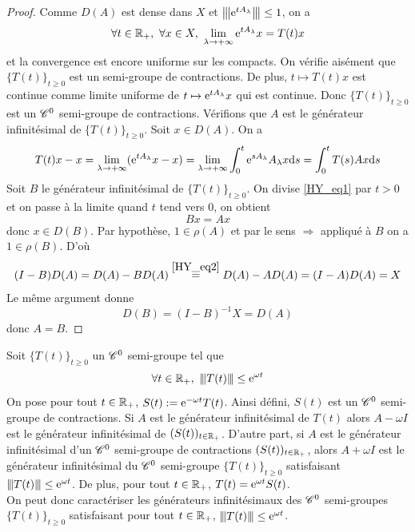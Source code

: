 \begin{proof}
    Comme $D(A)$ est dense dans $X$ et ${\left\vert\kern-0.25ex\left\vert \kern-0.25ex\left\vert \mathrm{e}^{tA_{\lambda}} \right\vert\kern-0.25ex\right\vert\kern-0.25ex\right\vert} \leq 1$, on a 
    \begin{equation*}
        \forall t \in \bbR_+, \ \forall x \in X, \ \lim_{\lambda \to +\infty}\ex^{tA_{\lambda}}x=T(t)x
    \end{equation*}
    et la convergence est encore uniforme sur les compacts. On vérifie aisément que $\big\{T(t)\big\}_{t \geq 0}$ est un semi-groupe de contractions. De plus, $t \mapsto T(t)x$ est continue comme limite uniforme de $t \mapsto \mathrm{e}^{tA_{\lambda}}x$ qui est continue. Donc $\big\{T(t)\big\}_{t\geq 0}$ est un $\mathscr{C}^0$ semi-groupe de contractions. Vérifions que $A$ est le générateur infinitésimal de $\big\{T(t)\big\}_{t\geq 0}$. Soit $x \in D(A)$. On a 
    \begin{equation}\label{HY_eq1}
        T(t)x-x = \lim_{\lambda \to +\infty} (\mathrm{e}^{tA_{\lambda}}x-x) = \lim_{\lambda \to +\infty} \int_0^t \mathrm{e}^{sA_{\lambda}}A_{\lambda}x\mathrm{d} s = \int_0^tT(s)Ax\mathrm{d} s
    \end{equation}
    Soit $B$ le générateur infinitésimal de $\big\{T(t)\big\}_{t\geq0}$. On divise \eqref{HY_eq1} par $t>0$ et on passe à la limite quand $t$ tend vers $0$, on obtient 
    \begin{equation}\label{HY_eq2}
        Bx=Ax
    \end{equation}
    donc $x \in D(B)$. Par hypothèse, $1 \in \rho(A)$ et par le sens $\boxed{\Longrightarrow}$ appliqué à $B$ on a $1 \in \rho(B)$. D'où 
    \begin{equation*}
        (I-B)D(A) = D(A)-BD(A) \overset{\eqref{HY_eq2}}{=} D(A)-AD(A) = (I-A)D(A) = X
    \end{equation*}
    Le même argument donne 
    \begin{equation*}
        D(B) = (I-B)^{-1}X = D(A)
    \end{equation*}
    donc $A=B$.
\end{proof}

\begin{remark}\label{rq_SG}
    Soit $\big\{T(t)\big\}_{t \geq 0}$ un $\mathscr{C}^0$ semi-groupe tel que 
    \begin{equation*}
        \forall t \in \mathbb{R}_+, \ {\left\vert\kern-0.25ex\left\vert \kern-0.25ex\left\vert T(t) \right\vert\kern-0.25ex\right\vert\kern-0.25ex\right\vert} \leq \mathrm{e}^{\omega t}
    \end{equation*}
    On pose pour tout $t \in \mathbb{R}_+$, $S(t):=\mathrm{e}^{-\omega t}T(t)$. Ainsi défini, $S(t)$ est un $\mathscr{C}^0$ semi-groupe de contractions. Si $A$ est le générateur infinitésimal de $T(t)$ alors $A-\omega I$ est le générateur infinitésimal de $(S(t))_{t \in \mathbb{R}_+}$. D'autre part, si $A$ est le générateur infinitésimal d'un $\mathscr{C}^0$ semi-groupe de contractions $(S(t))_{t \in \mathbb{R}_+}$, alors $A+\omega I$ est le générateur infinitésimal du $\mathscr{C}^0$ semi-groupe $\big\{T(t)\big\}_{t \geq 0}$ satisfaisant ${\left\vert\kern-0.25ex\left\vert \kern-0.25ex\left\vert T(t) \right\vert\kern-0.25ex\right\vert\kern-0.25ex\right\vert} \leq \mathrm{e}^{\omega t}$. De plus, pour tout $t \in \mathbb{R}_+$, $T(t) = \mathrm{e}^{\omega t}S(t)$.
    \\
    On peut donc caractériser les générateurs infinitésimaux des $\mathscr{C}^0$ semi-groupes $\big\{T(t)\big\}_{t \geq 0}$ satisfaisant pour tout $t \in \mathbb{R}_+$, ${\left\vert\kern-0.25ex\left\vert \kern-0.25ex\left\vert T(t) \right\vert\kern-0.25ex\right\vert\kern-0.25ex\right\vert} \leq \mathrm{e}^{\omega t}$.
\end{remark}

